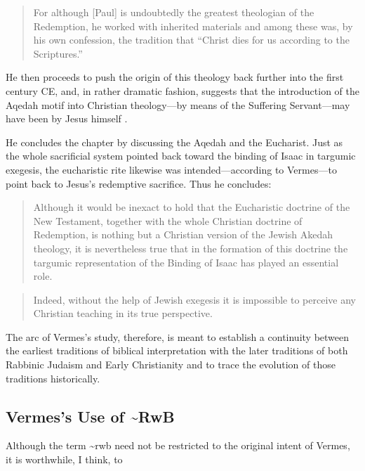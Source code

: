 \begin{quote}
For although {[}Paul{]} is undoubtedly the greatest theologian of the
Redemption, he worked with inherited materials and among these was, by
his own confession, the tradition that ``Christ dies for us according to
the Scriptures.''\autocite[221]{vermes1961}
\end{quote}

He then proceeds to push the origin of this theology back further into
the first century CE, and, in rather dramatic fashion, suggests that the
introduction of the Aqedah motif into Christian theology---by means of
the Suffering Servant---may have been by Jesus himself
\autocite[223]{vermes1961}.

He concludes the chapter by discussing the Aqedah and the Eucharist.
Just as the whole sacrificial system pointed back toward the binding of
Isaac in targumic exegesis, the eucharistic rite likewise was
intended---according to Vermes---to point back to Jesus's redemptive
sacrifice. Thus he concludes:

\begin{quote}
Although it would be inexact to hold that the Eucharistic doctrine of
the New Testament, together with the whole Christian doctrine of
Redemption, is nothing but a Christian version of the Jewish Akedah
theology, it is nevertheless true that in the formation of this doctrine
the targumic representation of the Binding of Isaac has played an
essential role.
\end{quote}

\begin{quote}
Indeed, without the help of Jewish exegesis it is impossible to perceive
any Christian teaching in its true
perspective.\autocite[227]{vermes1961}
\end{quote}

The arc of Vermes's study, therefore, is meant to establish a continuity
between the earliest traditions of biblical interpretation with the
later traditions of both Rabbinic Judaism and Early Christianity and to
trace the evolution of those traditions historically.

\subsection{Vermes's Use of
\textasciitilde{}RwB}\label{vermess-use-of-rwb}

Although the term \textasciitilde{}rwb need not be restricted to the
original intent of Vermes, it is worthwhile, I think, to

